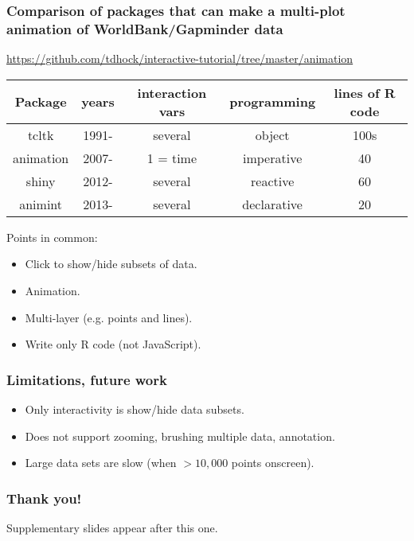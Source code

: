 \documentclass{beamer}
\begin{document}
\begin{frame}
  \frametitle{Comparison of packages that can make a multi-plot
    animation of WorldBank/Gapminder data}
\url{https://github.com/tdhock/interactive-tutorial/tree/master/animation}
\vskip 1cm
  \begin{tabular}{ccccc}
    Package & years & interaction vars & programming & lines of R code \\
    \hline
    tcltk & 1991- & several & object & 100s \\
    animation & 2007- & 1 = time & imperative & 40 \\
    shiny & 2012- & several & reactive & 60 \\
    animint & 2013- & several & declarative & 20 
  \end{tabular}
  \vskip 1cm
  Points in common:
  \begin{itemize}
  \item Click to show/hide subsets of data.
  \item Animation.
  \item Multi-layer (e.g. points and lines).
  \item Write only R code (not JavaScript).
  \end{itemize}
\end{frame}

\begin{frame}
  \frametitle{Limitations, future work}
  \begin{itemize}
  \item Only interactivity is show/hide data subsets.
  \item Does not support zooming, brushing multiple data, annotation.
  \item Large data sets are slow (when $>10,000$ points onscreen).
  \end{itemize}
\end{frame}

\begin{frame}
  \frametitle{Thank you!}
  Supplementary slides appear after this one.
\end{frame}
\end{document}
